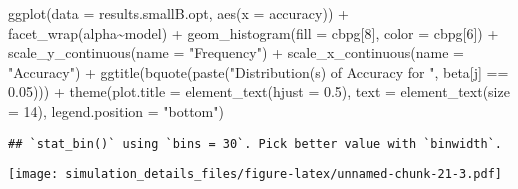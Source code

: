 \documentclass[
]{article}
\newenvironment{Shaded}{\begin{snugshade}}{\end{snugshade}}
\newcommand{\AttributeTok}[1]{\textcolor[rgb]{0.77,0.63,0.00}{#1}}
\newcommand{\DecValTok}[1]{\textcolor[rgb]{0.00,0.00,0.81}{#1}}
\newcommand{\FloatTok}[1]{\textcolor[rgb]{0.00,0.00,0.81}{#1}}
\newcommand{\FunctionTok}[1]{\textcolor[rgb]{0.00,0.00,0.00}{#1}}
\newcommand{\NormalTok}[1]{#1}
\newcommand{\SpecialCharTok}[1]{\textcolor[rgb]{0.00,0.00,0.00}{#1}}
\newcommand{\StringTok}[1]{\textcolor[rgb]{0.31,0.60,0.02}{#1}}
\begin{document}
\begin{Shaded}
\begin{Highlighting}[]
\FunctionTok{ggplot}\NormalTok{(}\AttributeTok{data =}\NormalTok{ results.smallB.opt,}
       \FunctionTok{aes}\NormalTok{(}\AttributeTok{x =}\NormalTok{ accuracy)) }\SpecialCharTok{+}
  \FunctionTok{facet\_wrap}\NormalTok{(alpha}\SpecialCharTok{\textasciitilde{}}\NormalTok{model) }\SpecialCharTok{+}
  \FunctionTok{geom\_histogram}\NormalTok{(}\AttributeTok{fill =}\NormalTok{ cbpg[}\DecValTok{8}\NormalTok{], }\AttributeTok{color =}\NormalTok{ cbpg[}\DecValTok{6}\NormalTok{]) }\SpecialCharTok{+}
  \FunctionTok{scale\_y\_continuous}\NormalTok{(}\AttributeTok{name =} \StringTok{"Frequency"}\NormalTok{) }\SpecialCharTok{+}
  \FunctionTok{scale\_x\_continuous}\NormalTok{(}\AttributeTok{name =} \StringTok{"Accuracy"}\NormalTok{) }\SpecialCharTok{+}
  \FunctionTok{ggtitle}\NormalTok{(}\FunctionTok{bquote}\NormalTok{(}\FunctionTok{paste}\NormalTok{(}\StringTok{"Distribution(s) of Accuracy for "}\NormalTok{, beta[j] }\SpecialCharTok{==} \FloatTok{0.05}\NormalTok{))) }\SpecialCharTok{+}
  \FunctionTok{theme}\NormalTok{(}\AttributeTok{plot.title =} \FunctionTok{element\_text}\NormalTok{(}\AttributeTok{hjust =} \FloatTok{0.5}\NormalTok{), }
        \AttributeTok{text =} \FunctionTok{element\_text}\NormalTok{(}\AttributeTok{size =} \DecValTok{14}\NormalTok{),}
        \AttributeTok{legend.position =} \StringTok{"bottom"}\NormalTok{)}
\end{Highlighting}
\end{Shaded}

\begin{verbatim}
## `stat_bin()` using `bins = 30`. Pick better value with `binwidth`.
\end{verbatim}

\texttt{[image: simulation\_details\_files/figure-latex/unnamed-chunk-21-3.pdf]}
\end{document}

